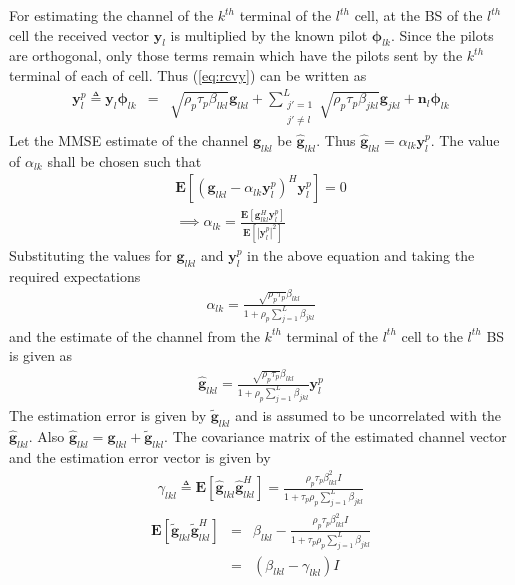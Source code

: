 \documentclass[10pt, a4paper, twoside,fleqn]{article}
\begin{document}
For estimating the channel of the $k^{th}$ terminal of the $l^{th}$ cell, at the BS of the $l^{th}$ cell the received vector $\pmb{y}_{l}$ is multiplied by the known pilot $\pmb{\phi}_{lk}$. Since the pilots are orthogonal, only those terms remain which have the pilots sent by the $k^{th}$ terminal of each of cell. Thus (\ref{eq:rcvy}) can be written as
\begin{eqnarray}
	\pmb{y}_{l}^{p} \triangleq \pmb{y}_{l} \pmb{\phi}_{lk}
                          &=&     \sqrt{\rho_p\tau_p\beta_{lkl}}\pmb{g}_{lkl}
                           +      \sum_{\substack{j'=1 \\ j' \neq l}}^{L} \sqrt{\rho_p\tau_p\beta_{jkl}}\pmb{g}_{jkl}
             			   +      \pmb{n}_{l}\pmb{\phi}_{lk}
\end{eqnarray}
Let the MMSE estimate of the channel $\pmb{g}_{lkl}$ be $\pmb{\hat g}_{lkl}$. Thus $\pmb{\hat g}_{lkl} = \alpha_{lk}\pmb{y}_{l}^{p}$. The value of $\alpha_{lk}$ shall be chosen such that        
\begin{eqnarray}
	\pmb{E}[(\pmb{g}_{lkl}-\alpha_{lk}\pmb{y}_{l}^{p})^H \pmb{y}_{l}^{p}] = 0 \\
	\implies \alpha_{lk} = \frac{\pmb{E}[\pmb{g}^{H}_{lkl} \pmb{y}_{l}^{p}]}{\pmb{E}[|\pmb{y}_{l}^{p}|^2]}
\end{eqnarray}
Substituting the values for $\pmb{g}_{lkl}$ and $\pmb{y}_{l}^{p}$ in the above equation and taking the required expectations
\begin{eqnarray}\label{eq:alphapll}
	\alpha_{lk}=\frac{\sqrt{\rho_p \tau_p} \beta_{lkl}}{1+\rho_p\sum\limits_{j=1}^{L}\beta_{jkl}}
\end{eqnarray}
and the estimate of the channel from the $k^{th}$ terminal of the $l^{th}$ cell to the $l^{th}$ BS is given as
\begin{eqnarray}\label{eq:estimatehpll}
	\pmb{\hat g}_{lkl} = \frac{\sqrt{\rho_p\tau_p}\beta_{lkl}}{1+\rho_p\sum\limits_{j=1}^{L}\beta_{jkl}} \pmb{y}_{l}^{p}
\end{eqnarray}
The estimation error is given by ${\pmb{\widetilde{g}}_{lkl}}$ and is assumed to be uncorrelated with the $\pmb{\hat g}_{lkl}$. Also $\pmb{\hat g}_{lkl}=\pmb{g}_{lkl}+\pmb{\widetilde{g}}_{lkl}$.
The covariance matrix of the estimated channel vector and the estimation error vector is given by
\begin{eqnarray}
	\gamma_{lkl} \triangleq \pmb{E}[\pmb{\hat g}_{lkl}\pmb{\hat g}^H_{lkl}]
                    =       \frac{\rho_p\tau_p\beta^2_{lkl}I}{1+\tau_p\rho_p\sum\limits_{j=1}^{L}\beta_{jkl}} 
\end{eqnarray}
\begin{eqnarray}
    \pmb{E}[\pmb{\widetilde{g}}_{lkl} \pmb{\widetilde{g}}^H_{lkl}] &=& \beta_{lkl}- \frac{\rho_p\tau_p\beta^2_{lkl}I}{1+\tau_p\rho_p\sum\limits_{j=1}^{L}\beta_{jkl}} \nonumber\\
          									    &=& (\beta_{lkl} - \gamma_{lkl})I
\end{eqnarray}
\end{document}
